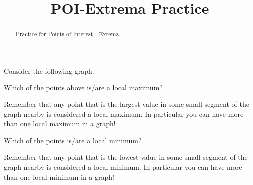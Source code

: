 \documentclass{ximera}
\title{POI-Extrema Practice}
\begin{document}
\begin{abstract}
    Practice for Points of Interest - Extema.
\end{abstract}
\maketitle


\begin{problem}
    Consider the following graph.
    \begin{center}
    \end{center}
    
    Which of the points above is/are a local maximum?
    \begin{selectAll}
    \end{selectAll}
    \begin{feedback}
        Remember that any point that is the largest value in some small segment of the graph nearby is considered a local maximum. In particular you can have more than one local maximum in a graph!
    \end{feedback}
    
    \begin{problem}
        Which of the points is/are a local minimum?
        \begin{selectAll}
        \end{selectAll}
        \begin{feedback}
            Remember that any point that is the lowest value in some small segment of the graph nearby is considered a local minimum. In particular you can have more than one local minimum in a graph!
        \end{feedback}
    

\end{problem}
\end{problem}
\end{document}
